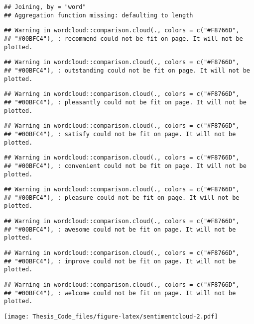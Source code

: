 \documentclass[]{article}
\begin{document}
\begin{verbatim}
## Joining, by = "word"
## Aggregation function missing: defaulting to length
\end{verbatim}

\begin{verbatim}
## Warning in wordcloud::comparison.cloud(., colors = c("#F8766D",
## "#00BFC4"), : recommend could not be fit on page. It will not be plotted.
\end{verbatim}

\begin{verbatim}
## Warning in wordcloud::comparison.cloud(., colors = c("#F8766D",
## "#00BFC4"), : outstanding could not be fit on page. It will not be plotted.
\end{verbatim}

\begin{verbatim}
## Warning in wordcloud::comparison.cloud(., colors = c("#F8766D",
## "#00BFC4"), : pleasantly could not be fit on page. It will not be plotted.
\end{verbatim}

\begin{verbatim}
## Warning in wordcloud::comparison.cloud(., colors = c("#F8766D",
## "#00BFC4"), : satisfy could not be fit on page. It will not be plotted.
\end{verbatim}

\begin{verbatim}
## Warning in wordcloud::comparison.cloud(., colors = c("#F8766D",
## "#00BFC4"), : convenient could not be fit on page. It will not be plotted.
\end{verbatim}

\begin{verbatim}
## Warning in wordcloud::comparison.cloud(., colors = c("#F8766D",
## "#00BFC4"), : pleasure could not be fit on page. It will not be plotted.
\end{verbatim}

\begin{verbatim}
## Warning in wordcloud::comparison.cloud(., colors = c("#F8766D",
## "#00BFC4"), : awesome could not be fit on page. It will not be plotted.
\end{verbatim}

\begin{verbatim}
## Warning in wordcloud::comparison.cloud(., colors = c("#F8766D",
## "#00BFC4"), : improve could not be fit on page. It will not be plotted.
\end{verbatim}

\begin{verbatim}
## Warning in wordcloud::comparison.cloud(., colors = c("#F8766D",
## "#00BFC4"), : welcome could not be fit on page. It will not be plotted.
\end{verbatim}

\texttt{[image: Thesis\_Code\_files/figure-latex/sentimentcloud-2.pdf]}
\end{document}
